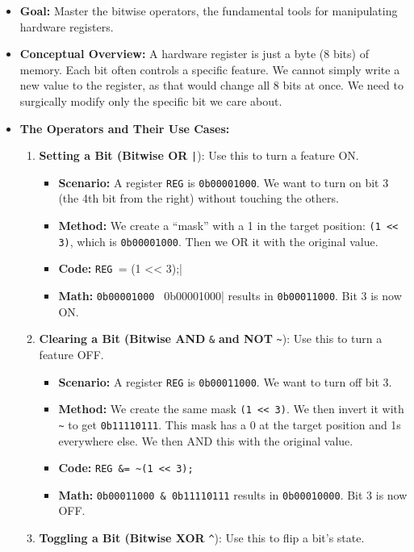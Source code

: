 \documentclass[11pt,a4paper]{article}
\begin{document}
\begin{itemize}
    \item \textbf{Goal:} Master the bitwise operators, the fundamental tools for manipulating hardware registers.
    \item \textbf{Conceptual Overview:} A hardware register is just a byte (8 bits) of memory. Each bit often controls a specific feature. We cannot simply write a new value to the register, as that would change all 8 bits at once. We need to surgically modify only the specific bit we care about.
    \item \textbf{The Operators and Their Use Cases:}
    \begin{enumerate}[label=\arabic*.]
    \item \textbf{Setting a Bit (Bitwise OR} \verb#|#): Use this to turn a feature ON.
        \begin{itemize}
            \item \textbf{Scenario:} A register \verb|REG| is \verb|0b00001000|. We want to turn on bit 3 (the 4th bit from the right) without touching the others.
            \item \textbf{Method:} We create a ``mask'' with a 1 in the target position: \verb|(1 << 3)|, which is \verb|0b00001000|. Then we OR it with the original value.
            \item \textbf{Code:} \verb|REG |= (1 << 3);|
            \item \textbf{Math:} \verb|0b00001000 | 0b00001000| results in \verb|0b00011000|. Bit 3 is now ON.
        \end{itemize}
\item \textbf{Clearing a Bit (Bitwise AND} \verb|&| \textbf{and NOT} \verb|~|): Use this to turn a feature OFF.
        \begin{itemize}
            \item \textbf{Scenario:} A register \verb|REG| is \verb|0b00011000|. We want to turn off bit 3.
            \item \textbf{Method:} We create the same mask \verb|(1 << 3)|. We then invert it with \verb|~| to get \verb|0b11110111|. This mask has a 0 at the target position and 1s everywhere else. We then AND this with the original value.
            \item \textbf{Code:} \verb|REG &= ~(1 << 3);|
            \item \textbf{Math:} \verb|0b00011000 & 0b11110111| results in \verb|0b00010000|. Bit 3 is now OFF.
        \end{itemize}
\item \textbf{Toggling a Bit (Bitwise XOR} \verb|^|): Use this to flip a bit's state.

\end{enumerate}
\end{itemize}
\end{document}
